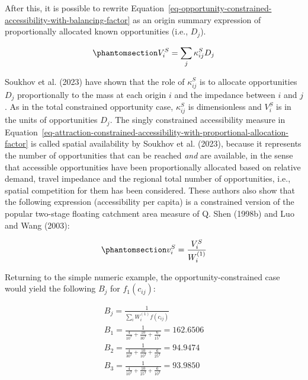 \documentclass[
]{article}
\begin{document}
After this, it is possible to rewrite
Equation~\ref{eq-opportunity-constrained-accessibility-with-balancing-factor}
as an origin summary expression of proportionally allocated known
opportunities (i.e., \(D_j\)).

\begin{equation}\phantomsection\label{eq-attraction-constrained-accessibility-with-proportional-allocation-factor}{
V^S_{i} = \sum_j \kappa^S_{ij} D_j
}\end{equation}

Soukhov et al. (2023) have shown that the role of \(\kappa^S_{ij}\) is
to allocate opportunities \(D_j\) proportionally to the mass at each
origin \(i\) and the impedance between \(i\) and \(j\). As in the total
constrained opportunity case, \(\kappa^S_{ij}\) is dimensionless and
\(V_i^S\) is in the units of opportunities \(D_j\). The singly
constrained accessibility measure in
Equation~\ref{eq-attraction-constrained-accessibility-with-proportional-allocation-factor}
is called spatial availability by Soukhov et al. (2023), because it
represents the number of opportunities that can be reached \emph{and}
are available, in the sense that accessible opportunities have been
proportionally allocated based on relative demand, travel impedance and
the regional total number of opportunities, i.e., spatial competition
for them has been considered. These authors also show that the following
expression (accessibility per capita) is a constrained version of the
popular two-stage floating catchment area measure of Q. Shen (1998b) and
Luo and Wang (2003):

\begin{equation}\phantomsection\label{eq-opportunity-constrained-accessibility-per-capita}{
v^S_{i} = \frac{V^S_{i}}{W^{(1)}_i}
}\end{equation}

Returning to the simple numeric example, the opportunity-constrained
case would yield the following \(B_{j}\) for \(f_1(c_{ij})\):

\[
\begin{array}{l}
B_{j} = \frac{1}{\sum_i W_i^{(1)} f(c_{ij})}\\
B_{1} =  \frac{1}{\frac{4}{10^3} + \frac{10}{30^3} + \frac{6}{15^3}} = 162.6506\\ 
B_{2} =  \frac{1}{\frac{4}{30^3} + \frac{10}{10^3} + \frac{6}{25^3}} = 94.9474\\
B_{3} =  \frac{1}{\frac{4}{10^3} + \frac{10}{25^3} + \frac{6}{10^3}} = 93.9850
\end{array}
\]
\end{document}
